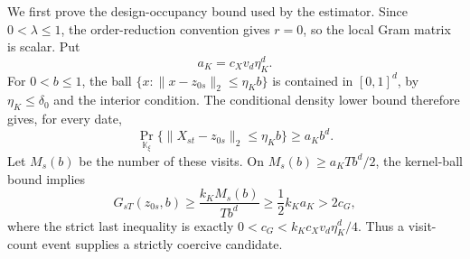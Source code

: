 We first prove the design-occupancy bound used by the estimator.  Since
\(0<\lambda\le1\), the order-reduction convention gives \(r=0\), so the
local Gram matrix is scalar.  Put
\[
 a_K=c_Xv_d\eta_K^d.
\]
For \(0<b\le1\), the ball
\(\{x:\|x-z_{0s}\|_2\le\eta_Kb\}\) is contained in \([0,1]^d\), by
\(\eta_K\le\delta_0\) and the interior condition.  The conditional density
lower bound therefore gives, for every date,
\[
 \Pr_{\mathbb K_\xi}
 \{\|X_{st}-z_{0s}\|_2\le\eta_Kb\}
 \ge a_Kb^d.                                                   \tag{2}
\]
Let \(M_s(b)\) be the number of these visits.  On
\(M_s(b)\ge a_KTb^d/2\), the kernel-ball bound implies
\[
 G_{sT}(z_{0s},b)
 \ge \frac{k_KM_s(b)}{Tb^d}
 \ge\frac12k_Ka_K>2c_G,                                      \tag{3}
\]
where the strict last inequality is exactly
\(0<c_G<k_Kc_Xv_d\eta_K^d/4\).  Thus a visit-count event supplies a
strictly coercive candidate.

